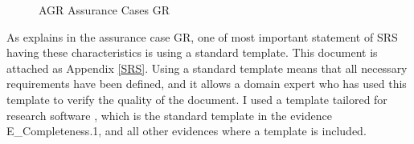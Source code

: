 \begin{figure}[hp]
    \centering
    \caption[AGR Assurance Cases GR]{AGR Assurance Cases GR}
    \label{fig_agr_ac_gr}
\end{figure}

As explains in the assurance case GR, one of  most important statement of SRS having these characteristics is using a standard template. This document is attached as Appendix \ref{SRS}. Using  a standard template means that all necessary requirements have been defined, and it allows a domain expert who has used this template to verify the quality of the document. I used a template tailored for research software \cite{Smith2006}, which is the standard template in the evidence E\_Completeness.1, and all other evidences where a template is included.

